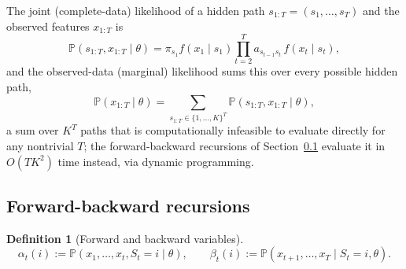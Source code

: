 \documentclass[11pt]{article}
\theoremstyle{definition}
\newtheorem{definition}[theorem]{Definition}
\theoremstyle{remark}
\begin{document}
The joint (complete-data) likelihood of a hidden path $s_{1:T}=(s_1,\dots,s_T)$ and the observed features $x_{1:T}$ is
\[
\mathbb{P}(s_{1:T},x_{1:T}\mid\theta) = \pi_{s_1}f(x_1\mid s_1)\prod_{t=2}^{T}a_{s_{t-1}s_t}\,f(x_t\mid s_t),
\]
and the observed-data (marginal) likelihood sums this over every possible hidden path,
\[
\mathbb{P}(x_{1:T}\mid\theta) = \sum_{s_{1:T}\in\{1,\dots,K\}^T}\mathbb{P}(s_{1:T},x_{1:T}\mid\theta),
\]
a sum over $K^T$ paths that is computationally infeasible to evaluate directly for any nontrivial $T$; the forward-backward recursions of Section~\ref{sec:forward-backward} evaluate it in $O(TK^2)$ time instead, via dynamic programming.

\subsection{Forward-backward recursions}
\label{sec:forward-backward}

\begin{definition}[Forward and backward variables]
\[
\alpha_t(i) := \mathbb{P}(x_1,\dots,x_t,S_t=i\mid\theta), \qquad
\beta_t(i) := \mathbb{P}(x_{t+1},\dots,x_T\mid S_t=i,\theta).
\]
\end{definition}
\end{document}
